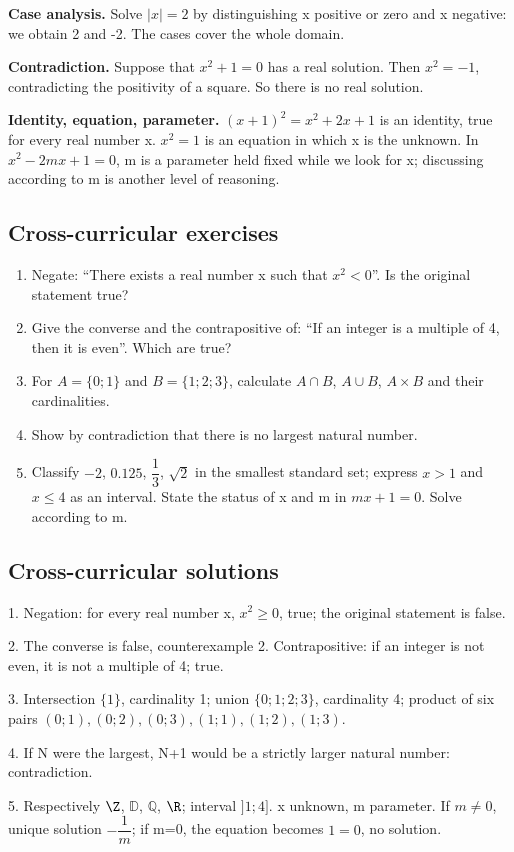 \textbf{Case analysis.} Solve $|x|=2$ by distinguishing x positive or zero and x negative: we obtain 2 and -2. The cases cover the whole domain.\par
\textbf{Contradiction.} Suppose that $x^2+1=0$ has a real solution. Then $x^2=-1$, contradicting the positivity of a square. So there is no real solution.\par
\textbf{Identity, equation, parameter.} $(x+1)^2=x^2+2x+1$ is an identity, true for every real number x. $x^2=1$ is an equation in which x is the unknown. In $x^2-2mx+1=0$, m is a parameter held fixed while we look for x; discussing according to m is another level of reasoning.

\subsection*{Cross-curricular exercises}\label{LOG-EX}
\begin{enumerate}
\item Negate: ``There exists a real number x such that $x^2<0$''. Is the original statement true?
\item Give the converse and the contrapositive of: ``If an integer is a multiple of 4, then it is even''. Which are true?
\item For $A=\{0;1\}$ and $B=\{1;2;3\}$, calculate $A\cap B$, $A\cup B$, $A\times B$ and their cardinalities.
\item Show by contradiction that there is no largest natural number.
\item Classify $-2$, $0.125$, $\dfrac{1}{3}$, $\sqrt2$ in the smallest standard set; express $x>1$ and $x\leq4$ as an interval. State the status of x and m in $mx+1=0$. Solve according to m.
\end{enumerate}
\ifprof
\subsection*{Cross-curricular solutions}
1. Negation: for every real number x, $x^2\geq0$, true; the original statement is false.\par
2. The converse is false, counterexample 2. Contrapositive: if an integer is not even, it is not a multiple of 4; true.\par
3. Intersection $\{1\}$, cardinality 1; union $\{0;1;2;3\}$, cardinality 4; product of six pairs $(0;1),(0;2),(0;3),(1;1),(1;2),(1;3)$.\par
4. If N were the largest, N+1 would be a strictly larger natural number: contradiction.\par
5. Respectively $\Z$, $\mathbb D$, $\mathbb Q$, $\R$; interval $]1;4]$. x unknown, m parameter. If $m\ne0$, unique solution $-\dfrac{1}{m}$; if m=0, the equation becomes $1=0$, no solution.
\fi

